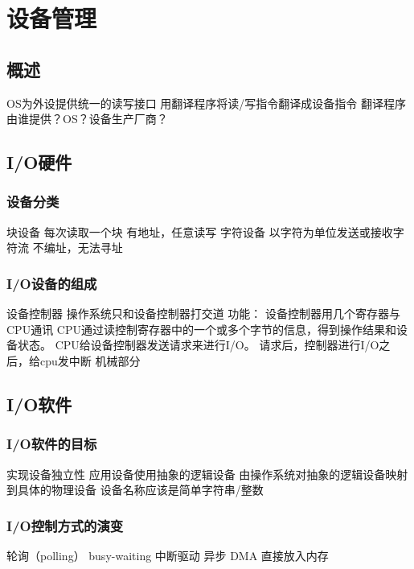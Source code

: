 \documentclass{ctexart}
\begin{document}
\section{设备管理}
\subsection{概述}
\begin{outline}
    \1 OS为外设提供统一的读写接口
    \1 用翻译程序将读/写指令翻译成设备指令
    \1 翻译程序由谁提供？OS？设备生产厂商？
\end{outline}
\subsection{I/O硬件}
\subsubsection{设备分类}
\begin{outline}
    \1 块设备
        \2 每次读取一个块
        \2 有地址，任意读写
    \1 字符设备
        \2 以字符为单位发送或接收字符流
        \2 不编址，无法寻址
\end{outline}
\subsubsection{I/O设备的组成}
\begin{outline}
    \1 设备控制器
        \2 操作系统只和设备控制器打交道
        \2 功能：
            \3 设备控制器用几个寄存器与CPU通讯
            \3 CPU通过读控制寄存器中的一个或多个字节的信息，得到操作结果和设备状态。
            \3 CPU给设备控制器发送请求来进行I/O。
            \3 请求后，控制器进行I/O之后，给cpu发中断
    \1 机械部分
\end{outline}
\subsection{I/O软件}
\subsubsection{I/O软件的目标}
\begin{outline}
    \1 实现设备独立性
        \2 应用设备使用抽象的逻辑设备
        \2 由操作系统对抽象的逻辑设备映射到具体的物理设备
        \3 设备名称应该是简单字符串/整数
\end{outline}
\subsubsection{I/O控制方式的演变}
\begin{outline}
    \1 轮询（polling）
        \2 busy-waiting
    \1 中断驱动
        \2 异步
    \1 DMA
        \2 直接放入内存
\end{outline}
\end{document}
